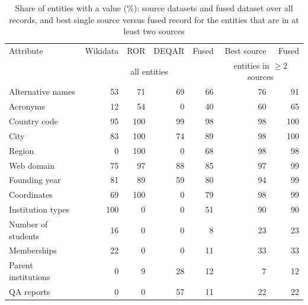 \begin{table}[t]
\caption{Share of entities with a value (\%): source datasets and fused dataset over all records, and best single source versus fused record for the entities that are in at least two sources}\label{tab:completeness}
\scriptsize
\setlength{\tabcolsep}{4pt}
\begin{tabular}{lrrrrrr}
\toprule
Attribute & Wikidata & ROR & DEQAR & Fused & Best source & Fused \\ & \multicolumn{4}{c}{all entities} & \multicolumn{2}{c}{entities in $\geq 2$ sources}\\
\midrule
Alternative names & 53 & 71 & 69 & 66 & 76 & 91\\
Acronyms & 12 & 54 & 0 & 40 & 60 & 65\\
Country code & 95 & 100 & 99 & 98 & 98 & 100\\
City & 83 & 100 & 74 & 89 & 98 & 100\\
Region & 0 & 100 & 0 & 68 & 98 & 98\\
Web domain & 75 & 97 & 88 & 85 & 97 & 99\\
Founding year & 81 & 89 & 59 & 80 & 94 & 99\\
Coordinates & 69 & 100 & 0 & 79 & 98 & 99\\
Institution types & 100 & 0 & 0 & 51 & 90 & 90\\
Number of students & 16 & 0 & 0 & 8 & 23 & 23\\
Memberships & 22 & 0 & 0 & 11 & 33 & 33\\
Parent institutions & 0 & 9 & 28 & 12 & 7 & 12\\
QA reports & 0 & 0 & 57 & 11 & 22 & 22\\
\bottomrule
\end{tabular}
\end{table}
